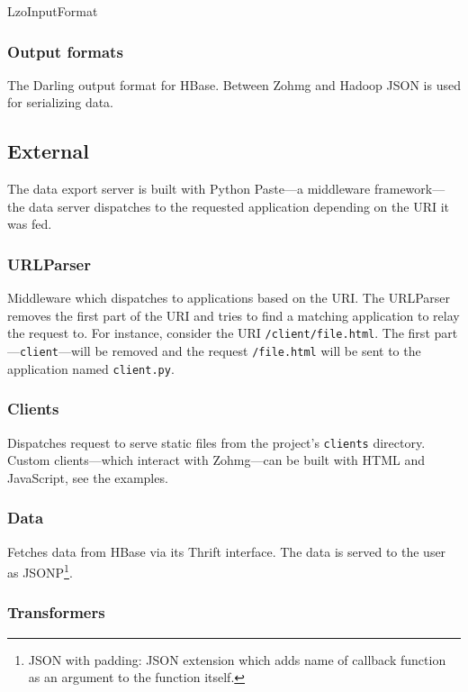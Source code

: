 \documentclass[a4paper,10pt]{book}
\begin{document}
LzoInputFormat


\subsubsection{Output formats}

The Darling output format for HBase. Between Zohmg and Hadoop JSON is used
for serializing data.


\subsection{External}

The data export server is built with Python Paste---a middleware
framework---the data server dispatches to the requested application
depending on the URI it was fed.


\subsubsection{URLParser}

Middleware which dispatches to applications based on the URI. The URLParser
removes the first part of the URI and tries to find a matching application
to relay the request to. For instance, consider the URI
\texttt{/client/file.html}. The first part---\texttt{client}---will be
removed and the request \texttt{/file.html} will be sent to the application
named \texttt{client.py}.


\subsubsection{Clients}

Dispatches request to serve static files from the project's
\texttt{clients} directory. Custom clients---which interact with Zohmg---can
be built with HTML and JavaScript, see the examples.


\subsubsection{Data}

Fetches data from HBase via its Thrift interface. The data is served to the
user as JSONP\footnote{JSON with padding: JSON extension which adds name of
callback function as an argument to the function itself.}.


\subsubsection{Transformers}
\end{document}
